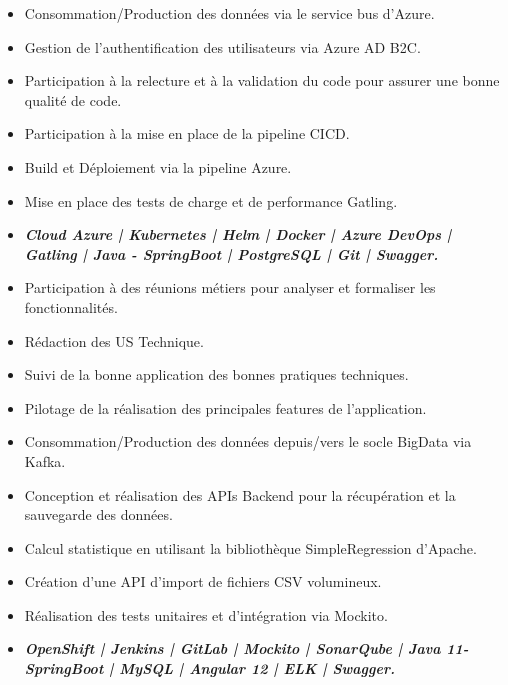 
\begin{itemize}
\item Consommation/Production des données via le service bus d’Azure.
\item Gestion de l’authentification des utilisateurs via Azure AD B2C.
\item Participation à la relecture et à la validation du code pour assurer une bonne qualité de code.
\item Participation à la mise en place de la pipeline CICD.
\item Build et Déploiement via la pipeline Azure.
\item Mise en place des tests de charge et de performance Gatling.
\item \textbf {\emph{Cloud Azure | Kubernetes | Helm | Docker | Azure DevOps | Gatling  | Java - SpringBoot | PostgreSQL | Git  | Swagger.}}
\end{itemize}

\divider

\begin{itemize}
\item Participation à des réunions métiers pour analyser et formaliser les fonctionnalités.
\item Rédaction des US Technique.
\item Suivi de la bonne application des bonnes pratiques techniques.
\item Pilotage de la réalisation des principales features de l’application.
\item Consommation/Production des données depuis/vers le socle BigData via Kafka.
\item Conception et réalisation des APIs Backend pour la récupération et la sauvegarde des données.
\item Calcul statistique en utilisant la bibliothèque SimpleRegression d’Apache.
\item Création d'une API d'import de fichiers CSV volumineux.
\item Réalisation des tests unitaires et d’intégration via Mockito.
\item \textbf {\emph{OpenShift | Jenkins | GitLab | Mockito | SonarQube | Java 11- SpringBoot | MySQL | Angular 12 | ELK | Swagger.}}

\end{itemize}

